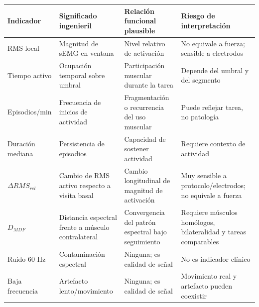 \documentclass[
  spanish,
  a4paper,
  DIV=11,
  numbers=noendperiod]{scrreprt}
\newcounter{none} %
\begin{document}
{\def\LTcaptype{none} %
\begin{longtable}[]{@{}
  >{\raggedright\arraybackslash}p{}
  >{\raggedright\arraybackslash}p{}
  >{\raggedright\arraybackslash}p{}
  >{\raggedright\arraybackslash}p{}@{}}
\toprule\noalign{}
\begin{minipage}[b]{\linewidth}\raggedright
Indicador
\end{minipage} & \begin{minipage}[b]{\linewidth}\raggedright
Significado ingenieril
\end{minipage} & \begin{minipage}[b]{\linewidth}\raggedright
Relación funcional plausible
\end{minipage} & \begin{minipage}[b]{\linewidth}\raggedright
Riesgo de interpretación
\end{minipage} \\
\midrule\noalign{}
\endhead
\bottomrule\noalign{}
\endlastfoot
RMS local & Magnitud de sEMG en ventana & Nivel relativo de activación &
No equivale a fuerza; sensible a electrodos \\
Tiempo activo & Ocupación temporal sobre umbral & Participación muscular
durante la tarea & Depende del umbral y del segmento \\
Episodios/min & Frecuencia de inicios de actividad & Fragmentación o
recurrencia del uso muscular & Puede reflejar tarea, no patología \\
Duración mediana & Persistencia de episodios & Capacidad de sostener
actividad & Requiere contexto de actividad \\
\(\Delta RMS_{rel}\) & Cambio de RMS activo respecto a visita basal &
Cambio longitudinal de magnitud de activación & Muy sensible a
protocolo/electrodos; no equivale a fuerza \\
\(D_{MDF}\) & Distancia espectral frente a músculo contralateral &
Convergencia del patrón espectral bajo seguimiento & Requiere músculos
homólogos, bilateralidad y tareas comparables \\
Ruido 60 Hz & Contaminación espectral & Ninguna; es calidad de señal &
No es indicador clínico \\
Baja frecuencia & Artefacto lento/movimiento & Ninguna; es calidad de
señal & Movimiento real y artefacto pueden coexistir \\
\end{longtable}
}
\end{document}
